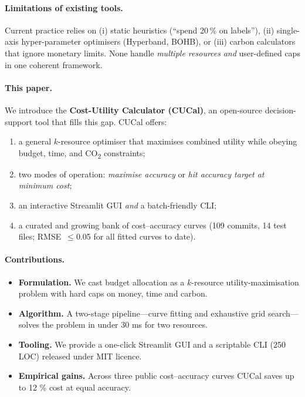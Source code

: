 \documentclass[11pt]{article}
\begin{document}
\paragraph{Limitations of existing tools.}
Current practice relies on
(i) static heuristics (“spend 20\,\% on labels”),
(ii) single-axis hyper-parameter optimisers (Hyperband, BOHB), or
(iii) carbon calculators that ignore monetary limits.
None handle \emph{multiple resources} \emph{and} user-defined caps in
one coherent framework.

\paragraph{This paper.}
We introduce the \textbf{Cost-Utility Calculator (CUCal)}, an
open-source decision-support tool that fills this gap.
CUCal offers:
\begin{enumerate}
  \item a general \(k\)-resource optimiser that maximises combined
        utility while obeying budget, time, and
        \mbox{CO\textsubscript{2}} constraints;
  \item two modes of operation: \emph{maximise accuracy} or
        \emph{hit accuracy target at minimum cost};
  \item an interactive Streamlit GUI \emph{and} a batch-friendly CLI;
  \item a curated and growing bank of cost–accuracy curves
        (109 commits, 14 test files; RMSE~\(\le\)0.05 for all fitted
        curves to date).
\end{enumerate}

\paragraph{Contributions.}
\begin{itemize}
  \item \textbf{Formulation.}  We cast budget allocation as a
        $k$-resource utility-maximisation problem with hard caps on
        money, time and carbon.
  \item \textbf{Algorithm.}  A two-stage pipeline—curve fitting and
        exhaustive grid search—solves the problem in under 30 ms for
        two resources.
  \item \textbf{Tooling.}  We provide a one-click Streamlit GUI and a
        scriptable CLI (250 LOC) released under MIT licence.
  \item \textbf{Empirical gains.}  Across three public
        cost–accuracy curves CUCal saves up to 12 \% cost at equal
        accuracy.
\end{itemize}
\end{document}
